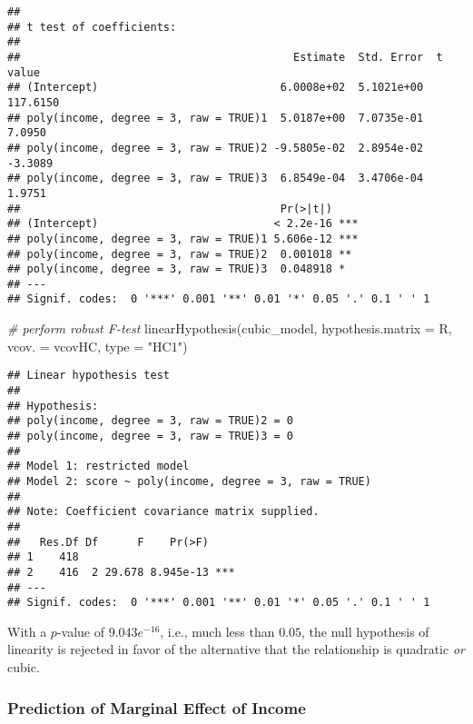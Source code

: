 \documentclass[
]{article}
\newenvironment{Shaded}{\begin{snugshade}}{\end{snugshade}}
\newcommand{\AttributeTok}[1]{\textcolor[rgb]{0.77,0.63,0.00}{#1}}
\newcommand{\CommentTok}[1]{\textcolor[rgb]{0.56,0.35,0.01}{\textit{#1}}}
\newcommand{\FunctionTok}[1]{\textcolor[rgb]{0.00,0.00,0.00}{#1}}
\newcommand{\NormalTok}[1]{#1}
\newcommand{\StringTok}[1]{\textcolor[rgb]{0.31,0.60,0.02}{#1}}
\begin{document}
\begin{verbatim}
## 
## t test of coefficients:
## 
##                                          Estimate  Std. Error  t value
## (Intercept)                            6.0008e+02  5.1021e+00 117.6150
## poly(income, degree = 3, raw = TRUE)1  5.0187e+00  7.0735e-01   7.0950
## poly(income, degree = 3, raw = TRUE)2 -9.5805e-02  2.8954e-02  -3.3089
## poly(income, degree = 3, raw = TRUE)3  6.8549e-04  3.4706e-04   1.9751
##                                        Pr(>|t|)    
## (Intercept)                           < 2.2e-16 ***
## poly(income, degree = 3, raw = TRUE)1 5.606e-12 ***
## poly(income, degree = 3, raw = TRUE)2  0.001018 ** 
## poly(income, degree = 3, raw = TRUE)3  0.048918 *  
## ---
## Signif. codes:  0 '***' 0.001 '**' 0.01 '*' 0.05 '.' 0.1 ' ' 1
\end{verbatim}

\begin{Shaded}
\begin{Highlighting}[]
\CommentTok{\# perform robust F{-}test }
\FunctionTok{linearHypothesis}\NormalTok{(cubic\_model, }
                 \AttributeTok{hypothesis.matrix =}\NormalTok{ R,}
                 \AttributeTok{vcov. =}\NormalTok{ vcovHC, }\AttributeTok{type =} \StringTok{"HC1"}\NormalTok{)}
\end{Highlighting}
\end{Shaded}

\begin{verbatim}
## Linear hypothesis test
## 
## Hypothesis:
## poly(income, degree = 3, raw = TRUE)2 = 0
## poly(income, degree = 3, raw = TRUE)3 = 0
## 
## Model 1: restricted model
## Model 2: score ~ poly(income, degree = 3, raw = TRUE)
## 
## Note: Coefficient covariance matrix supplied.
## 
##   Res.Df Df      F    Pr(>F)    
## 1    418                        
## 2    416  2 29.678 8.945e-13 ***
## ---
## Signif. codes:  0 '***' 0.001 '**' 0.01 '*' 0.05 '.' 0.1 ' ' 1
\end{verbatim}

With a \(p\)-value of \(9.043e^{-16}\), i.e., much less than \(0.05\),
the null hypothesis of linearity is rejected in favor of the alternative
that the relationship is quadratic \emph{or} cubic.

\hypertarget{prediction-of-marginal-effect-of-income}{%
\subsubsection{Prediction of Marginal Effect of
Income}\label{prediction-of-marginal-effect-of-income}}
\end{document}
